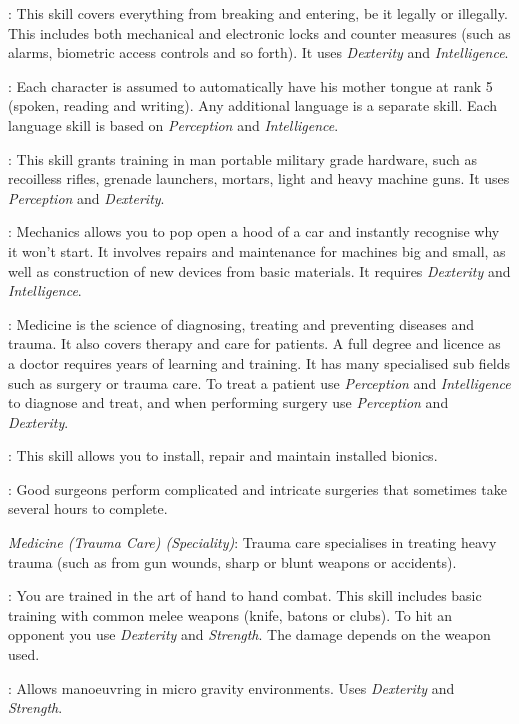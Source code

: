 : This skill covers everything from breaking and entering, be
it legally or illegally. This includes both mechanical and electronic locks and
counter measures (such as alarms, biometric access controls and so forth). It
uses \emph{Dexterity} and \emph{Intelligence}.

: Each character is assumed to automatically have his mother
tongue at rank 5 (spoken, reading and writing). Any additional language is a
separate skill. Each language skill is based on \emph{Perception} and
\emph{Intelligence}.

: This skill grants training in man portable military
grade hardware, such as recoilless rifles, grenade launchers, mortars, light
and heavy machine guns. It uses \emph{Perception} and \emph{Dexterity}.

: Mechanics allows you to pop open a hood of a car and instantly
recognise why it won't start. It involves repairs and maintenance for machines
big and small, as well as construction of new devices from basic materials. It
requires \emph{Dexterity} and \emph{Intelligence}.

: Medicine is the science of diagnosing, treating and
preventing diseases and trauma. It also covers therapy and care for patients.
A full degree and licence as a doctor requires years of learning and training.
It has many specialised sub fields such as surgery or trauma care. To treat a
patient use \emph{Perception} and \emph{Intelligence} to diagnose and treat,
and when performing surgery use \emph{Perception} and \emph{Dexterity}.

: This skill allows you to install, repair
and maintain installed bionics.

: Good surgeons perform complicated and
intricate surgeries that sometimes take several hours to complete.

\emph{Medicine (Trauma Care) (Speciality)}: Trauma care specialises in treating
heavy trauma (such as from gun wounds, sharp or blunt weapons or accidents).

: You are trained in the art of hand to hand combat. This
skill includes basic training with common melee weapons (knife, batons or
clubs). To hit an opponent you use \emph{Dexterity} and \emph{Strength}.
The damage depends on the weapon used.

: Allows manoeuvring in micro gravity environments. Uses
\emph{Dexterity} and \emph{Strength}.

